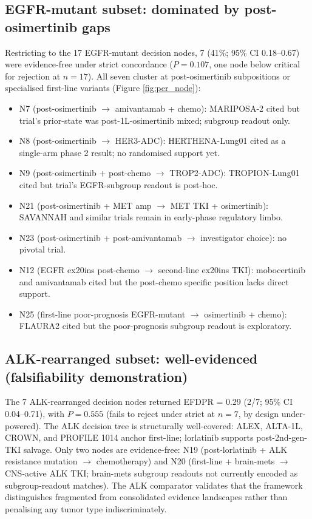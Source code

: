 \documentclass[11pt,a4paper]{article}
\begin{document}
\subsection{EGFR-mutant subset: dominated by post-osimertinib gaps}
Restricting to the 17 EGFR-mutant decision nodes, 7 (41\%; 95\% CI 0.18--0.67) were evidence-free under strict concordance ($P = 0.107$, one node below critical for rejection at $n = 17$). All seven cluster at post-osimertinib subpositions or specialised first-line variants (Figure \ref{fig:per_node}):
\begin{itemize}
\item N7 (post-osimertinib $\to$ amivantamab + chemo): MARIPOSA-2 cited but trial's prior-state was post-1L-osimertinib mixed; subgroup readout only.
\item N8 (post-osimertinib $\to$ HER3-ADC): HERTHENA-Lung01 cited as a single-arm phase 2 result; no randomised support yet.
\item N9 (post-osimertinib + post-chemo $\to$ TROP2-ADC): TROPION-Lung01 cited but trial's EGFR-subgroup readout is post-hoc.
\item N21 (post-osimertinib + MET amp $\to$ MET TKI + osimertinib): SAVANNAH and similar trials remain in early-phase regulatory limbo.
\item N23 (post-osimertinib + post-amivantamab $\to$ investigator choice): no pivotal trial.
\item N12 (EGFR ex20ins post-chemo $\to$ second-line ex20ins TKI): mobocertinib and amivantamab cited but the post-chemo specific position lacks direct support.
\item N25 (first-line poor-prognosis EGFR-mutant $\to$ osimertinib + chemo): FLAURA2 cited but the poor-prognosis subgroup readout is exploratory.
\end{itemize}

\subsection{ALK-rearranged subset: well-evidenced (falsifiability demonstration)}
The 7 ALK-rearranged decision nodes returned EFDPR = 0.29 (2/7; 95\% CI 0.04--0.71), with $P = 0.555$ (fails to reject under strict at $n = 7$, by design under-powered). The ALK decision tree is structurally well-covered: ALEX, ALTA-1L, CROWN, and PROFILE 1014 anchor first-line; lorlatinib supports post-2nd-gen-TKI salvage. Only two nodes are evidence-free: N19 (post-lorlatinib + ALK resistance mutation $\to$ chemotherapy) and N20 (first-line + brain-mets $\to$ CNS-active ALK TKI; brain-mets subgroup readouts not currently encoded as subgroup-readout matches). The ALK comparator validates that the framework distinguishes fragmented from consolidated evidence landscapes rather than penalising any tumor type indiscriminately.
\end{document}
